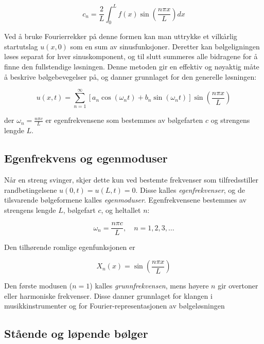\begin{equation*}
c_n = \frac{2}{L} \int_{0}^{L} f(x) \sin\left(\frac{n\pi x}{L}\right) dx
\end{equation*}

Ved å bruke Fourierrekker på denne formen kan man uttrykke et vilkårlig startutslag $u(x,0)$ som en sum av sinusfunksjoner.  
Deretter kan bølgeligningen løses separat for hver sinuskomponent, og til slutt summeres alle bidragene for å finne den fullstendige løsningen.  
Denne metoden gir en effektiv og nøyaktig måte å beskrive bølgebevegelser på, og danner grunnlaget for den generelle løsningen:

\begin{equation*}
u(x,t) = \sum_{n=1}^{\infty} \left[a_n \cos(\omega_n t) + b_n \sin(\omega_n t)\right] \sin\left(\frac{n\pi x}{L}\right)
\end{equation*}

der $\omega_n = \frac{n\pi c}{L}$ er egenfrekvensene som bestemmes av bølgefarten $c$ og strengens lengde $L$.

\subsection{Egenfrekvens og egenmoduser}

Når en streng svinger, skjer dette kun ved bestemte frekvenser som tilfredsstiller randbetingelsene $u(0,t)=u(L,t)=0$.  
Disse kalles \textit{egenfrekvenser}, og de tilsvarende bølgeformene kalles \textit{egenmoduser}.  
Egenfrekvensene bestemmes av strengens lengde $L$, bølgefart $c$, og heltallet $n$:

\begin{equation*}
\omega_n = \frac{n\pi c}{L}, \quad n = 1,2,3,\dots
\end{equation*}

Den tilhørende romlige egenfunksjonen er

\begin{equation*}
X_n(x) = \sin\left(\frac{n\pi x}{L}\right)
\end{equation*}

Den første modusen ($n=1$) kalles \textit{grunnfrekvensen}, mens høyere $n$ gir overtoner eller harmoniske frekvenser.  
Disse danner grunnlaget for klangen i musikkinstrumenter og for Fourier-representasjonen av bølgeløsningen \parencite{physicsClassroomFundamental}

\subsection{Stående og løpende bølger}

